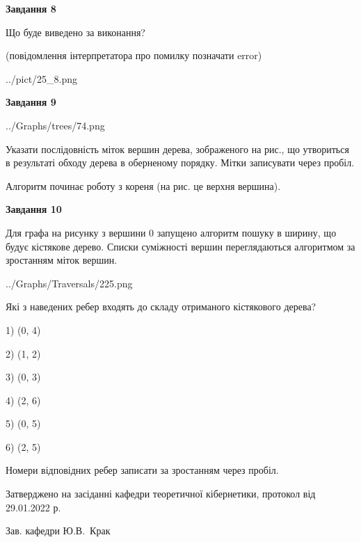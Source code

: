 \documentclass[12pt, ukrainian]{article}
\begin{document}
{\begin {large}
{\begin {center}\textbf{Завдання 8}\end {center}}\par
Що буде виведено за виконання?\par
 (повідомлення інтерпретатора про помилку позначати error)\par
\begin{center}
	{../pict/25_8.png}
\end{center}
\newpage

{\begin {center}\textbf{Завдання 9}\end {center}}\par

\begin{center}
	{../Graphs/trees/74.png}
\end{center}
Указати послідовність міток вершин дерева, зображеного на рис., що утвориться в результаті обходу дерева в оберненому порядку. Мітки записувати через пробіл.\par Алгоритм починає роботу з кореня (на рис. це верхня вершина).\par
\newpage

{\begin {center}\textbf{Завдання 10}\end {center}}\par
Для графа на рисунку з вершини 0 запущено алгоритм пошуку в ширину, що будує кістякове дерево. Списки суміжності вершин переглядаються алгоритмом за зростанням міток вершин.\par
\begin{center}
	{../Graphs/Traversals/225.png}
\end{center}
\par Які з наведених ребер входять до складу отриманого кістякового дерева?\par
1) (0, 4)\par
2) (1, 2)\par
3) (0, 3)\par
4) (2, 6)\par
5) (0, 5)\par
6) (2, 5)\par
{\vskip 15pt} Номери відповідних ребер записати за зростанням через пробіл.\par
\newpage


\end {large}
}
{\smallskip \begin {small} Затверджено на засіданні кафедри теоретичної кібернетики, протокол  від   29.01.2022 р.\par\smallskip\smallskip
{\parbox {6.5 cm}{Зав. кафедри \dotfill Ю.В.~Крак}} \end{small}}
\end{document}
